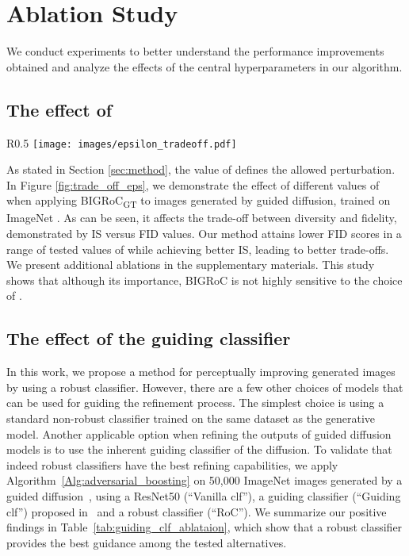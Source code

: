 \documentclass[10pt]{article} \usepackage[accepted]{tmlr}
\begin{document}
\section{Ablation Study}
We conduct experiments to better understand the performance improvements obtained and analyze the effects of the central hyperparameters in our algorithm.

\subsection{The effect of \texorpdfstring{}{TEXT}}
\begin{wrapfigure}{R}{0.5\textwidth}
    \vspace{-0.3cm}
    \centering
    \texttt{[image: images/epsilon\_tradeoff.pdf]}
    \caption{\textbf{Trade-off effects of \bm{}}. Demonstrated on Guided-Diffusion trained on ImageNet .
    }
    \label{fig:trade_off_eps}
    \vspace{-0.8cm}
\end{wrapfigure}
As stated in Section \ref{sec:method}, the value of  defines the allowed perturbation.
In Figure \ref{fig:trade_off_eps}, we demonstrate the effect of different values of  when applying BIGRoC\textsubscript{GT} to images generated by guided diffusion, trained on ImageNet .
As can be seen, it affects the trade-off between diversity and fidelity, demonstrated by IS versus FID values.
Our method attains lower FID scores in a range of tested values of  while achieving better IS, leading to better trade-offs. We present additional ablations in the supplementary materials.
This study shows that although its importance, BIGRoC is not highly sensitive to the choice of .

\subsection{The effect of the guiding classifier}
In this work, we propose a method for perceptually improving generated images by using a robust classifier. 
However, there are a few other choices of models that can be used for guiding the refinement process.
The simplest choice is using a standard non-robust classifier trained on the same dataset as the generative model. 
Another applicable option when refining the outputs of guided diffusion models is to use the inherent guiding classifier of the diffusion.
To validate that indeed robust classifiers have the best refining capabilities, we apply Algorithm~\ref{Alg:adversarial_boosting} on 50,000 ImageNet  images generated by a guided diffusion~\citep{dhariwal2021diffusion}, using a ResNet50 (``Vanilla clf''), a guiding classifier (``Guiding clf'') proposed in~\citep{dhariwal2021diffusion} and a robust classifier (``RoC'').
We summarize our positive findings in Table~\ref{tab:guiding_clf_ablataion}, which show that a robust classifier provides the best guidance among the tested alternatives.
\end{document}
